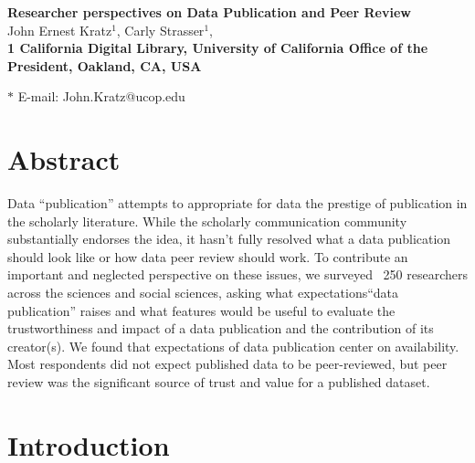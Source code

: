 \documentclass[10pt]{article}
\date{}
\begin{document}
\begin{flushleft}
{\Large
\textbf{Researcher perspectives on Data Publication and Peer Review}
}
\\
John Ernest Kratz$^{1}$, 
Carly Strasser$^{1}$, 
\\
\bf{1} California Digital Library, University of California Office of the President, Oakland, CA, USA

$\ast$ E-mail: John.Kratz@ucop.edu
\end{flushleft}


\section*{Abstract}

Data ``publication'' attempts to appropriate for data the prestige of publication in the scholarly literature. 
While the scholarly communication community substantially endorses the idea, it hasn't fully resolved what a data publication should look like or how data peer review should work. 
To contribute an important and neglected perspective on these issues, we surveyed ~250 researchers across the sciences and social sciences, asking what expectations``data publication'' raises and what features would be useful to evaluate the trustworthiness and impact of a data publication and the contribution of its creator(s).  
We found that expectations of data publication center on availability.
Most respondents did not expect published data to be peer-reviewed, but peer review was the significant source of trust and value for a published dataset.


\section*{Introduction}
\end{document}
